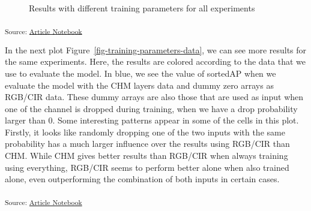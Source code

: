 \documentclass[
]{report}
\begin{document}
\begin{figure}[H]


\caption{\label{fig-training-parameters-experiments}Results with
different training parameters for all experiments}

\end{figure}%

\textsubscript{Source:
\href{https://ZokszY.github.io/Geodan-internship-report/index-preview.html}{Article
Notebook}}

In the next plot Figure~\ref{fig-training-parameters-data}, we can see
more results for the same experiments. Here, the results are colored
according to the data that we use to evaluate the model. In blue, we see
the value of sortedAP when we evaluate the model with the CHM layers
data and dummy zero arrays as RGB/CIR data. These dummy arrays are also
those that are used as input when one of the channel is dropped during
training, when we have a drop probability larger than 0. Some
interesting patterns appear in some of the cells in this plot. Firstly,
it looks like randomly dropping one of the two inputs with the same
probability has a much larger influence over the results using RGB/CIR
than CHM. While CHM gives better results than RGB/CIR when always
training using everything, RGB/CIR seems to perform better alone when
also trained alone, even outperforming the combination of both inputs in
certain cases.

\textsubscript{Source:
\href{https://ZokszY.github.io/Geodan-internship-report/index-preview.html}{Article
Notebook}}
\end{document}

